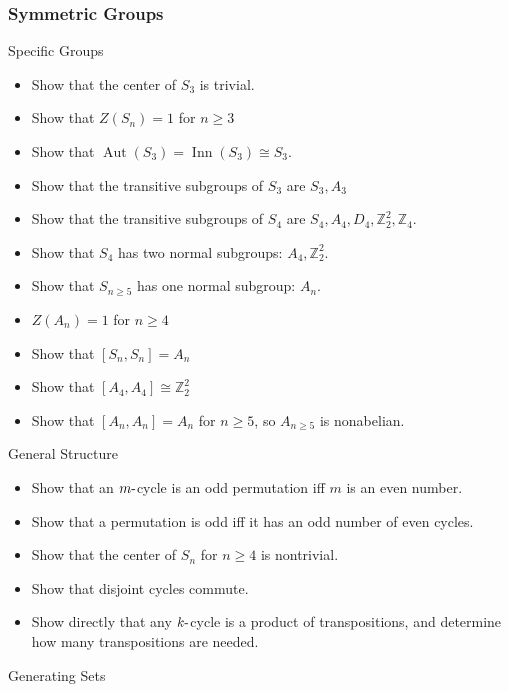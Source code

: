 \hypertarget{symmetric-groups}{%
\subsubsection{Symmetric Groups}\label{symmetric-groups}}

Specific Groups

\begin{itemize}
\tightlist
\item
  Show that the center of \(S_3\) is trivial.
\item
  Show that \(Z(S_n) = 1\) for \(n\geq 3\)
\item
  Show that
  \({\operatorname{Aut}}(S_3) = {\operatorname{Inn}}(S_3) \cong S_3\).
\item
  Show that the transitive subgroups of \(S_3\) are \(S_3, A_3\)
\item
  Show that the transitive subgroups of \(S_4\) are
  \(S_4, A_4, D_4, {\mathbb{Z}}_2^2, {\mathbb{Z}}_4\).
\item
  Show that \(S_4\) has two normal subgroups: \(A_4, {\mathbb{Z}}_2^2\).
\item
  Show that \(S_{n\geq 5}\) has one normal subgroup: \(A_n\).
\item
  \(Z(A_n) = 1\) for \(n\geq 4\)
\item
  Show that \([S_n, S_n] = A_n\)
\item
  Show that \([A_4, A_4] \cong {\mathbb{Z}}_2^2\)
\item
  Show that \([A_n, A_n] = A_n\) for \(n\geq 5\), so \(A_{n\geq 5}\) is
  nonabelian.
\end{itemize}

General Structure

\begin{itemize}
\tightlist
\item
  Show that an \(m{\hbox{-}}\)cycle is an odd permutation iff \(m\) is
  an even number.
\item
  Show that a permutation is odd iff it has an odd number of even
  cycles.
\item
  Show that the center of \(S_n\) for \(n\geq 4\) is nontrivial.
\item
  Show that disjoint cycles commute.
\item
  Show directly that any \(k{\hbox{-}}\)cycle is a product of
  transpositions, and determine how many transpositions are needed.
\end{itemize}

Generating Sets

